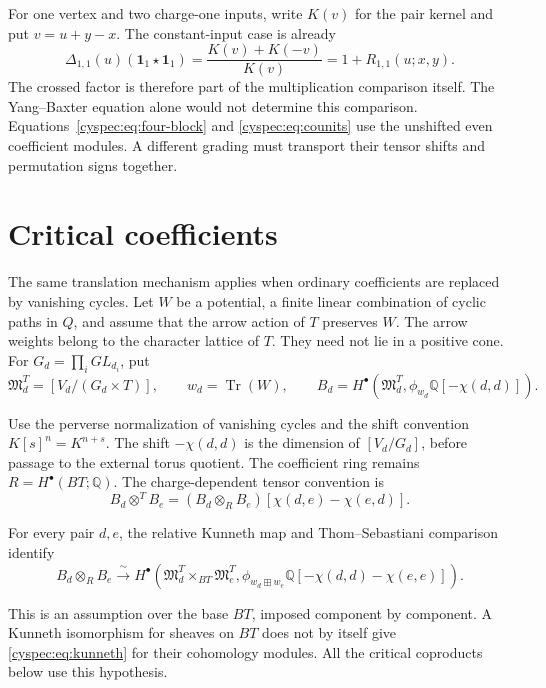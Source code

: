 For one vertex and two charge-one inputs, write $K(v)$ for the pair
kernel and put $v=u+y-x$. The constant-input case is already
\[
 \Delta_{1,1}(u)(\mathbf1_1\star\mathbf1_1)
 =\frac{K(v)+K(-v)}{K(v)}=1+R_{1,1}(u;x,y).
\]
The crossed factor is therefore part of the multiplication
comparison itself. The Yang--Baxter equation alone would not
determine this comparison. Equations~\eqref{cyspec:eq:four-block}
and \eqref{cyspec:eq:counits} use the unshifted even coefficient
modules. A different grading must transport their tensor shifts
and permutation signs together.

\section{Critical coefficients}
\label{cyspec:sec:critical}

The same translation mechanism applies when ordinary coefficients
are replaced by vanishing cycles. Let $W$ be a potential, a finite
linear combination of cyclic paths in $Q$, and assume that the
arrow action of $T$ preserves $W$. The arrow weights belong to the
character lattice of $T$. They need not lie in a positive cone.
For $G_d=\prod_iGL_{d_i}$, put
\[
 \mathfrak M_d^T=[V_d/(G_d\times T)],\qquad
 w_d=\operatorname{Tr}(W),\qquad
 B_d=H^\bullet(\mathfrak M_d^T,
                  \phi_{w_d}\mathbb Q[-\chi(d,d)]).
\]

Use the perverse normalization of vanishing cycles and the shift
convention $K[s]^n=K^{n+s}$. The shift $-\chi(d,d)$ is the dimension
of $[V_d/G_d]$, before passage to the external torus quotient.
The coefficient ring remains $R=H^\bullet(BT;\mathbb Q)$.
The charge-dependent tensor convention is
\[
 B_d\otimes^T B_e=(B_d\otimes_R B_e)[\chi(d,e)-\chi(e,d)].
\]

\begin{assumption}\label{cyspec:ass:kunneth}
For every pair $d,e$, the relative Kunneth map and Thom--Sebastiani
comparison identify
\begin{equation}\label{cyspec:eq:kunneth}
 B_d\otimes_R B_e\xrightarrow{\ \sim\ }
 H^\bullet\left(\mathfrak M_d^T\times_{BT}\mathfrak M_e^T,
 \phi_{w_d\boxplus w_e}\mathbb Q[-\chi(d,d)-\chi(e,e)]\right).
\end{equation}
\end{assumption}

This is an assumption over the base $BT$, imposed component by
component. A Kunneth isomorphism for sheaves on $BT$ does not by
itself give \eqref{cyspec:eq:kunneth} for their cohomology modules.
All the critical coproducts below use this hypothesis.

